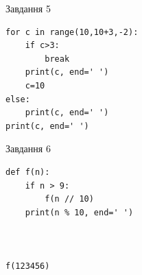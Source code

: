 \documentclass[12pt, ukrainian]{article}
\begin{document}
{\vspace{15mm}
\begin{minipage}[t]{9.7cm}                
{\begin{center}Завдання {5}\end{center}}
\begin{verbatim}
for c in range(10,10+3,-2):
    if c>3:
        break
    print(c, end=' ')
    c=10
else:
    print(c, end=' ')
print(c, end=' ')
\end{verbatim}     
\end{minipage}
\vline \hspace{8mm}
\begin{minipage}[t]{8.0cm}                
{\begin{center}Завдання {6}\end{center}}
\begin{verbatim}
def f(n):
    if n > 9:
        f(n // 10)
    print(n % 10, end=' ')
    


f(123456)
\end{verbatim}     
\end{minipage}

}
\newpage
\end{document}
